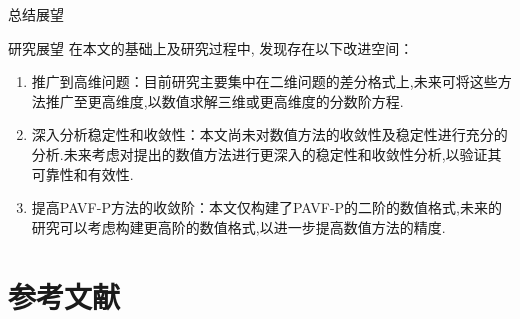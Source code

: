 \documentclass[aspectratio=169]{beamer}
\numberwithin{theorem}{section} %
\begin{document}
\begin{frame}{总结展望}
	\begin{block}{研究展望}
		在本文的基础上及研究过程中, 发现存在以下改进空间：
		\begin{enumerate}
			\item \textcolor[rgb]{0.227,0.373,0.306}{推广到高维问题：}目前研究主要集中在二维问题的差分格式上,未来可将这些方法推广至更高维度,以数值求解三维或更高维度的分数阶方程.
			\item \textcolor[rgb]{0.227,0.373,0.306}{深入分析稳定性和收敛性：}本文尚未对数值方法的收敛性及稳定性进行充分的分析.未来考虑对提出的数值方法进行更深入的稳定性和收敛性分析,以验证其可靠性和有效性.
			\item \textcolor[rgb]{0.227,0.373,0.306}{提高PAVF-P方法的收敛阶：}本文仅构建了PAVF-P的二阶的数值格式,未来的研究可以考虑构建更高阶的数值格式,以进一步提高数值方法的精度.
		\end{enumerate}
	\end{block}
\end{frame}
	
\section{参考文献}
\end{document}
